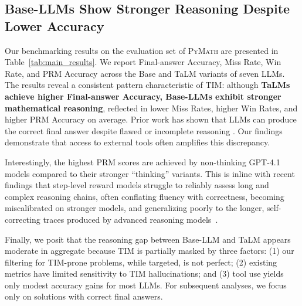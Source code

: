 \documentclass[11pt]{article}
\def \dataset{\textsc{PyMath}\xspace}
\def \task{\textsc{TIM}\xspace}
\newcommand{\pouya}[1]{{\color{violet}Pouya: #1}}
\newcommand{\estevam}[1]{{\color{blue}Estevam: #1}}
\begin{document}
\subsection{Base-LLMs Show Stronger Reasoning Despite Lower Accuracy}
\label{sec:benchmarking_results}
Our benchmarking results on the evaluation set of \dataset are presented in Table~\ref{tab:main_results}. We report Final-answer Accuracy, Miss Rate, Win Rate, and PRM Accuracy across the Base and TaLM variants of seven LLMs. The results reveal a consistent pattern characteristic of \task{}: although \textbf{TaLMs achieve higher Final-answer Accuracy, Base-LLMs exhibit stronger mathematical reasoning}, reflected in lower Miss Rates, higher Win Rates, and higher PRM Accuracy on average. Prior work has shown that LLMs can produce the correct final answer despite flawed or incomplete reasoning \citep{mondorf2024accuracyevaluatingreasoningbehavior}. Our findings demonstrate that access to external tools often amplifies this discrepancy. 

Interestingly, the highest PRM scores are achieved by non-thinking GPT-4.1 models compared to their stronger ``thinking'' variants. This is inline with recent findings that step-level reward models struggle to reliably assess long and complex reasoning chains, often conflating fluency with correctness, becoming miscalibrated on stronger models, and generalizing poorly to the longer, self-correcting traces produced by advanced reasoning models~\citep{BambaRewardUA, lee2025rethinkingrewardmodelsmultidomain}.

Finally, we posit that the reasoning gap between Base-LLM and TaLM appears moderate in aggregate because \task{} is partially masked by three factors: (1) our filtering for \task-prone problems, while targeted, is not perfect; (2) existing metrics have limited sensitivity to \task{} hallucinations; and (3) tool use yields only modest accuracy gains for most LLMs. For subsequent analyses, we focus only on solutions with correct final answers.
\end{document}
